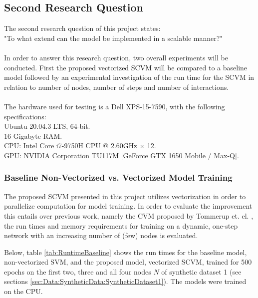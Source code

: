 \subsection{Second Research Question}
\label{sec:ResearchQuestion2}
The second research question of this project states:
\\
"To what extend can the model be implemented in a scalable manner?"
\\\\
In order to answer this research question, two overall experiments will be conducted.
First the proposed vectorized SCVM will be compared to a baseline model followed by an experimental investigation of the run time for the SCVM in relation to number of nodes, number of steps and number of interactions.
\\\\
The hardware used for testing is a Dell XPS-15-7590, with the following specifications:
\\
Ubuntu 20.04.3 LTS, 64-bit.
\\
16 Gigabyte RAM.
\\
CPU: Intel Core i7-9750H CPU @ 2.60GHz × 12.
\\
GPU: NVIDIA Corporation TU117M [GeForce GTX 1650 Mobile / Max-Q].


\subsubsection{Baseline Non-Vectorized vs. Vectorized Model Training}
\label{sec:ResearchQuestion2:BaselineComparison}
The proposed SCVM presented in this project utilizes vectorization in order to parallelize computation for model training.
In order to evaluate the improvement this entails over previous work, namely the CVM proposed by Tommerup et. el. \cite{Tommerup2021LearningNetworks}, the run times and memory requirements for training on a dynamic, one-step network with an increasing number of (few) nodes is evaluated.

Below, table \ref{tab:RuntimeBaseline} shows the run times for the baseline model, non-vectorized SVM, and the proposed model, vectorized SCVM, trained for 500 epochs on the first two, three and all four nodes $N$ of synthetic dataset 1 (see sections \ref{sec:Data:SyntheticData:SyntheticDataset1}).
The models were trained on the CPU.

